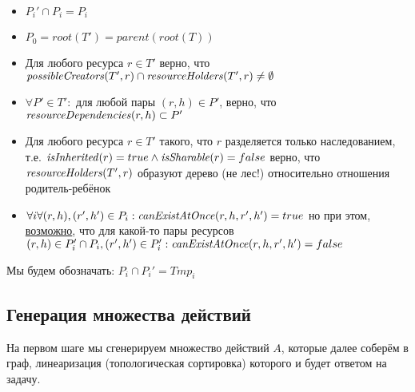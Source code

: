\begin{itemize}
	\item $P_i' \cap P_i = P_i$
	\item $P_0 = root(T') = parent(root(T))$
	\item Для любого ресурса $r \in T'$ верно, что $\text{\textit{possibleCreators}}(T', r) \cap \text{\textit{resourceHolders}}(T', r) \neq \emptyset$
	\item $\forall P' \in T': $ для любой пары $(r, h) \in P'$, верно, что $\text{\textit{resourceDependencies}}(r, h) \subset P'$
	\item Для любого ресурса $r \in T'$ такого, что $r$ разделяется только наследованием, т.е. $\text{\textit{isInherited}}(r) = true \land \text{\textit{isSharable}}(r) = false$ верно, что $\text{\textit{resourceHolders}}(T', r)$ образуют дерево (не лес!) относительно отношения родитель-ребёнок
	\item $\forall i \forall (r, h), (r', h') \in P_i: \text{\textit{canExistAtOnce}}(r, h, r', h') = true$ но при этом, \underline{возможно}, что для какой-то пары ресурсов $(r, h) \in P_i' \cap P_i, (r', h') \in P_i': \text{\textit{canExistAtOnce}}(r, h, r', h') = false$
\end{itemize}

Мы будем обозначать: $P_i \cap P_i' = Tmp_i$

\subsection{Генерация множества действий}

На первом шаге мы сгенерируем множество действий $A$, которые далее соберём в граф, линеаризация (топологическая сортировка) которого и будет ответом на задачу.

